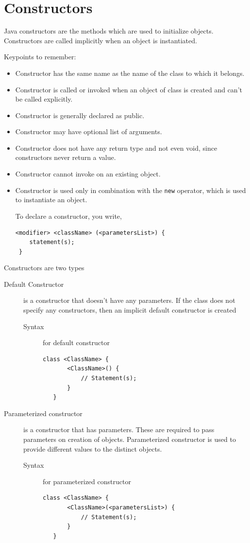 \documentclass[11pt,a4paper]{article}
\begin{document}
\section*{Constructors}
Java constructors are the methods which are used to initialize objects. Constructors are called implicitly when an object is instantiated.

Keypoints to remember:
\begin{itemize}
 \item Constructor has the same name as the name of the class to which it belongs.
 \item Constructor is called or invoked when an object of class is created and can't be called explicitly.
 \item Constructor is generally declared as public.
 \item Constructor may have optional list of arguments.
 \item Constructor does not have any return type and not even void, since constructors never return a value.
 \item Constructor cannot invoke on an existing object.
 \item Constructor is used only in combination with the \lstinline!new! operator, which is used to instantiate an object.

To declare a constructor, you write,
\begin{lstlisting}[numbers=none]
 <modifier> <className> (<parametersList>) {
    statement(s);
 }
\end{lstlisting}
\end{itemize}
Constructors are two types
 \begin{description}
  \item [Default Constructor] is a constructor that doesn't have any parameters. If the class does not specify any constructors, then an implicit default constructor is created
  \begin{description}
  \item [Syntax] for default constructor
  \begin{lstlisting}[numbers=none]
   class <ClassName> {
       <ClassName>() {
           // Statement(s);
       }
   }
  \end{lstlisting}
 \end{description}
 \item [Parameterized constructor] is a constructor that has parameters. These are required to pass parameters on creation of objects. Parameterized constructor is used to provide different values to the
distinct objects.
\begin{description}
  \item [Syntax] for parameterized constructor
  
   \begin{lstlisting}[numbers=none]
   class <ClassName> {
       <ClassName>(<parametersList>) {
           // Statement(s);
       }
   }
  \end{lstlisting}
  \end{description}
 \end{description}
 
\end{document}
